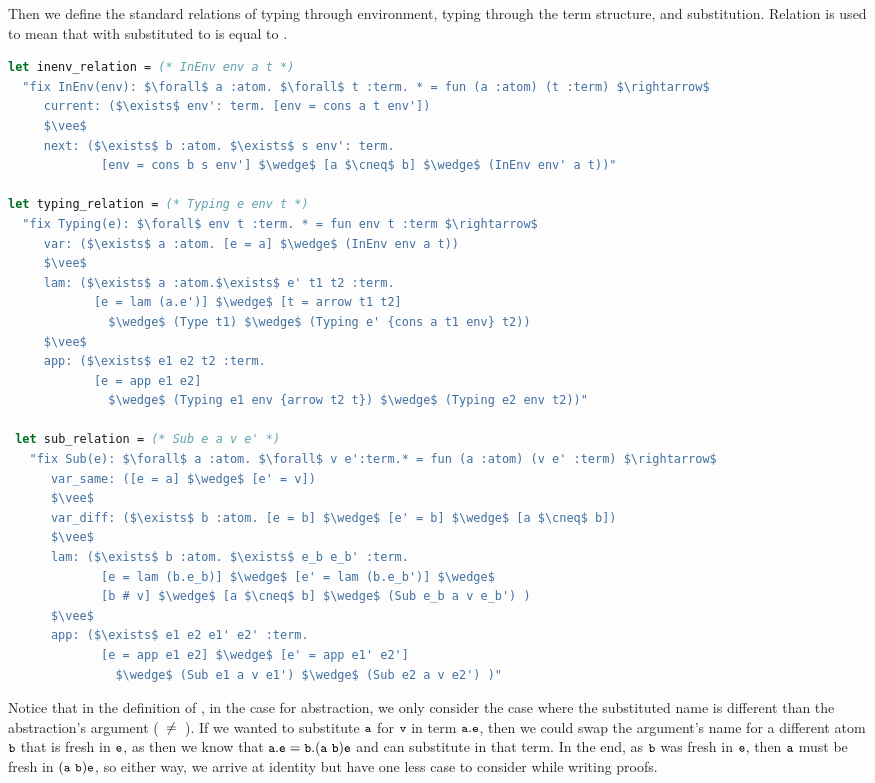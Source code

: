 \documentclass[english, mgr]{iithesis}
\renewcommand{\tt}[1]{\texttt{\small{#1}}}
\newcommand{\lstt}[1]{\text{{\lstinline[columns=fixed,mathescape]|#1|}}}
\begin{document}
Then we define the standard relations of typing through environment,
typing through the term structure, and substitution.
Relation \lstt{(Sub e a v e')} is used
to mean that \lstt{e} with \lstt{a} substituted to \lstt{v} is equal to \lstt{e'}.
\begin{lstlisting}[mathescape,language=OCaml, escapebegin=\color{codepurple}]
let inenv_relation = (* InEnv env a t *)
  "fix InEnv(env): $\forall$ a :atom. $\forall$ t :term. * = fun (a :atom) (t :term) $\rightarrow$
     current: ($\exists$ env': term. [env = cons a t env'])
     $\vee$
     next: ($\exists$ b :atom. $\exists$ s env': term.
             [env = cons b s env'] $\wedge$ [a $\cneq$ b] $\wedge$ (InEnv env' a t))"

let typing_relation = (* Typing e env t *)
  "fix Typing(e): $\forall$ env t :term. * = fun env t :term $\rightarrow$
     var: ($\exists$ a :atom. [e = a] $\wedge$ (InEnv env a t))
     $\vee$
     lam: ($\exists$ a :atom.$\exists$ e' t1 t2 :term.
            [e = lam (a.e')] $\wedge$ [t = arrow t1 t2]
              $\wedge$ (Type t1) $\wedge$ (Typing e' {cons a t1 env} t2))
     $\vee$
     app: ($\exists$ e1 e2 t2 :term.
            [e = app e1 e2]
              $\wedge$ (Typing e1 env {arrow t2 t}) $\wedge$ (Typing e2 env t2))"

 let sub_relation = (* Sub e a v e' *)
   "fix Sub(e): $\forall$ a :atom. $\forall$ v e':term.* = fun (a :atom) (v e' :term) $\rightarrow$
      var_same: ([e = a] $\wedge$ [e' = v])
      $\vee$
      var_diff: ($\exists$ b :atom. [e = b] $\wedge$ [e' = b] $\wedge$ [a $\cneq$ b])
      $\vee$
      lam: ($\exists$ b :atom. $\exists$ e_b e_b' :term.
             [e = lam (b.e_b)] $\wedge$ [e' = lam (b.e_b')] $\wedge$
             [b # v] $\wedge$ [a $\cneq$ b] $\wedge$ (Sub e_b a v e_b') )
      $\vee$
      app: ($\exists$ e1 e2 e1' e2' :term.
             [e = app e1 e2] $\wedge$ [e' = app e1' e2']
               $\wedge$ (Sub e1 a v e1') $\wedge$ (Sub e2 a v e2') )"
\end{lstlisting}
Notice that in the definition of \lstt{Sub}, in the case for abstraction, we only consider the case where the substituted name is different than the abstraction's argument (\lstt{a}~$\neq$~\lstt{b}).
If we wanted to substitute $\tt{a}$ for $\tt{v}$ in term $\tbind{\tt{a}}\tt{e}$, then we could swap the argument's name for a different atom $\tt{b}$ that is fresh in $\tt{e}$, as then we know that $\tbind{\tt{a}}\tt{e} \ceq \tbind{\tt{b}}\permswap{\tt{a}}{\tt{b}}\tt{e}$ and can substitute in that term.
In the end, as $\tt{b}$ was fresh in $\tt{e}$, then $\tt{a}$
must be fresh in $\permswap{\tt{a}}{\tt{b}}\tt{e}$, so either way,
we arrive at identity but have one less case to consider
while writing proofs.
\end{document}
